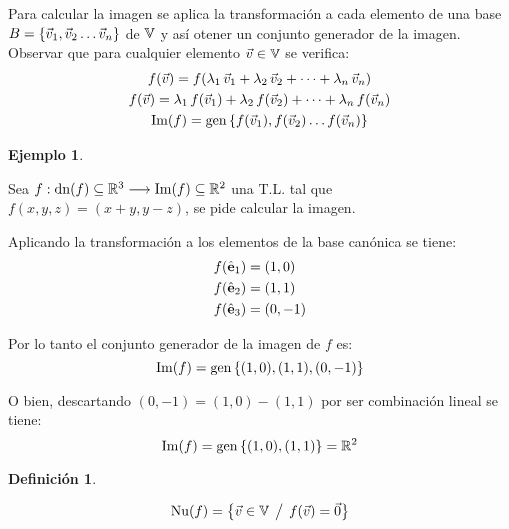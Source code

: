 \documentclass[a5paper,12pt,twoside]{book}
\newtheorem{defn}{{Definición}}[chapter]
\newtheorem{example}{{Ejemplo}}[chapter]
\begin{document}
Para calcular la imagen se aplica la transformación a cada elemento de una base $B={ \left\{ {\Vec{v}_1,\Vec{v}_2 \dots \Vec{v}_n} \right\} }$ de $\mathbb{V}$ y así otener un conjunto generador de la imagen.
Observar que para cualquier elemento $\Vec{v}\in\mathbb{V}$ se verifica:
\begin{gather*}
    f(\Vec{v}) = f(\lambda_1 \, \Vec{v}_1 + \lambda_2 \, \Vec{v}_2 + \dots + \lambda_n \, \Vec{v}_n)
    \\
    f(\Vec{v}) = \lambda_1 \, f(\Vec{v}_1) + \lambda_2 \, f(\Vec{v}_2) + \dots + \lambda_n \, f(\Vec{v}_n)
    \\
    \operatorname{Im}(f) = \operatorname{gen}{ \left\{ {f(\Vec{v}_1),f(\Vec{v}_2) \dots f(\Vec{v}_n)} \right\} }
\end{gather*}

\begin{mdframed}[style=ExampleFrame]
    \begin{example}
    \end{example}
    Sea $f:\operatorname{dn}(f) \subseteq \mathbb{R}^3 \longrightarrow \operatorname{Im}(f) \subseteq \mathbb{R}^2$ una T.L. tal que $f(x,y,z)=(x+y,y-z)$, se pide calcular la imagen.
    
    Aplicando la transformación a los elementos de la base canónica se tiene:
    \begin{align*}
        f(\hat{\textbf{e}}_1) &= (1,0)
        \\
        f(\hat{\textbf{e}}_2) &= (1,1)
        \\
        f(\hat{\textbf{e}}_3) &= (0,-1)
    \end{align*}
    
    Por lo tanto el conjunto generador de la imagen de $f$ es:
    \begin{equation*}
        \operatorname{Im}(f) = \operatorname{gen}{ \left\{ {(1,0),(1,1),(0,-1)} \right\} }
    \end{equation*}
    
    O bien, descartando $(0,-1)=(1,0)-(1,1)$ por ser combinación lineal se tiene:
    \begin{equation*}
        \operatorname{Im}(f) = \operatorname{gen}{ \left\{ {(1,0),(1,1)} \right\} } = \mathbb{R}^2
    \end{equation*}
\end{mdframed}

\begin{mdframed}[style=DefinitionFrame]
    \begin{defn}
    \end{defn}
    \begin{equation*}
        \operatorname{Nu}(f) = { \left\{ {\Vec{v} \in \mathbb{V} \hspace{1ex} \big/ \hspace{1ex} f(\Vec{v})=\Vec{0}} \right\} }
    \end{equation*}
\end{mdframed}
\end{document}
